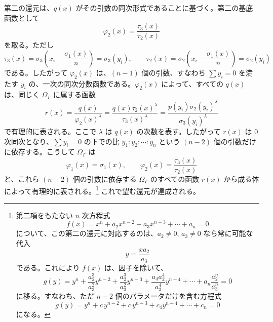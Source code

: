 \documentclass[11pt]{article}
\begin{document}
第二の還元は、$q(x)$ がその引数の同次形式であることに基づく。第二の基底函数として
\[
\varphi_2(x)=\frac{\tau_3(x)}{\tau_2(x)}
\]
を取る。ただし
\[
\tau_3(x)=\sigma_3\left(x_i-\frac{\sigma_1(x)}{n}\right)=\sigma_3(y_i),
\qquad
\tau_2(x)=\sigma_2\left(x_i-\frac{\sigma_1(x)}{n}\right)=\sigma_2(y_i)
\]
である。したがって $\varphi_2(x)$ は、$(n-1)$ 個の引数、すなわち $\sum y_i=0$ を満たす $y_i$ の、一次の同次分数函数である。$\varphi_2(x)$ によって、すべての $q(x)$ は、同じく $\Omega_\Gamma$ に属する函数
\[
r(x)=\frac{q(x)}{\varphi_2(x)^\lambda}
=\frac{q(x)\tau_2(x)^\lambda}{\tau_3(x)^\lambda}
=\frac{p(y_i)\sigma_2(y_i)^\lambda}{\sigma_3(y_i)^\lambda}
\]
で有理的に表される。ここで $\lambda$ は $q(x)$ の次数を表す。したがって $r(x)$ は 0 次同次となり、$\sum y_i=0$ の下での比 $y_1:y_2:\cdots:y_n$ という $(n-2)$ 個の引数だけに依存する。こうして $\Omega_\Gamma$ は
\[
\varphi_1(x)=\sigma_1(x),
\qquad
\varphi_2(x)=\frac{\tau_3(x)}{\tau_2(x)}
\]
と、これら $(n-2)$ 個の引数に依存する $\Omega_\Gamma$ のすべての函数 $r(x)$ から成る体によって有理的に表される。\footnote{第二項をもたない $n$ 次方程式
\[
f(x)=x^n+a_2x^{n-2}+a_3x^{n-3}+\cdots+a_n=0
\]
について、この第二の還元に対応するのは、$a_2\ne0$, $a_3\ne0$ なら常に可能な代入
\[
y=\frac{x a_2}{a_3}
\]
である。これにより $f(x)$ は、因子を除いて、
\[
g(y)=y^n+\frac{a_2^3}{a_3^2}y^{n-2}+\frac{a_2^3}{a_3^2}y^{n-3}
+\frac{a_4a_2^4}{a_3^4}y^{n-4}+\cdots+a_n\frac{a_2^n}{a_3^n}=0
\]
に移る。すなわち、ただ $n-2$ 個のパラメータだけを含む方程式
\[
g(y)=y^n+c\,y^{n-2}+c\,y^{n-3}+c_4y^{n-4}+\cdots+c_n=0
\]
になる。} これで望む還元が達成される。
\end{document}

